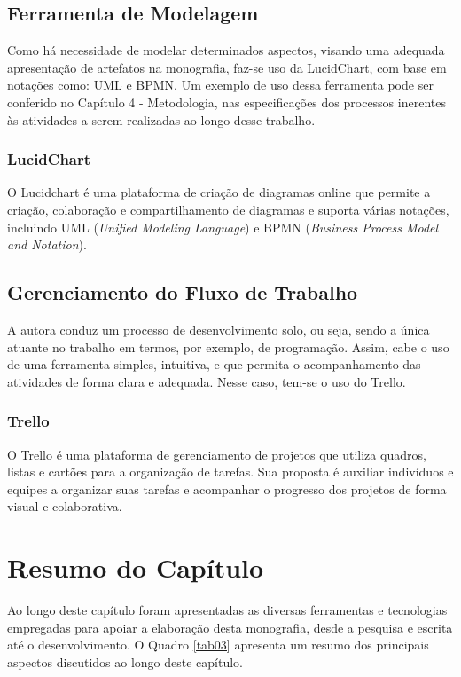 \subsection{Ferramenta de Modelagem}
\label{sec:Ferramenta de Modelagem}
Como há necessidade de modelar determinados aspectos, visando uma adequada apresentação de artefatos na monografia, faz-se uso da LucidChart, com base em notações como: UML e BPMN. Um exemplo de 
uso dessa ferramenta pode ser conferido no Capítulo 4 - Metodologia, nas especificações dos processos inerentes às atividades a serem realizadas ao longo desse trabalho.

\subsubsection{LucidChart}
\label{sec:LucidChart}
O Lucidchart \cite{lucidchart} é uma plataforma de criação de diagramas online que permite a criação, colaboração e compartilhamento de diagramas e suporta várias notações, incluindo UML (\textit{Unified Modeling Language}) 
e BPMN (\textit{Business Process Model and Notation}).

\subsection{Gerenciamento do Fluxo de Trabalho}
\label{sec:Gerenciamento do Fluxo de Trabalho}
A autora conduz um processo de desenvolvimento solo, ou seja, sendo a única atuante no trabalho em termos, por exemplo, de programação. Assim, cabe o uso de uma ferramenta simples, intuitiva, e que 
permita o acompanhamento das atividades de forma clara e adequada. Nesse caso, tem-se o uso do Trello.

\subsubsection{Trello}
\label{sec:Trello}
O Trello \cite{trello} é uma plataforma de gerenciamento de projetos que utiliza quadros, listas e cartões para a organização de tarefas. Sua proposta é auxiliar indivíduos e equipes a organizar suas tarefas e acompanhar o progresso 
dos projetos de forma visual e colaborativa.

\section{Resumo do Capítulo}
\label{sec:Resumo do Capítulo 2}
Ao longo deste capítulo foram apresentadas as diversas ferramentas e tecnologias empregadas para apoiar a elaboração desta monografia, desde a pesquisa e escrita até o desenvolvimento. 
O Quadro \ref{tab03} apresenta um resumo dos principais aspectos discutidos ao longo deste capítulo.

